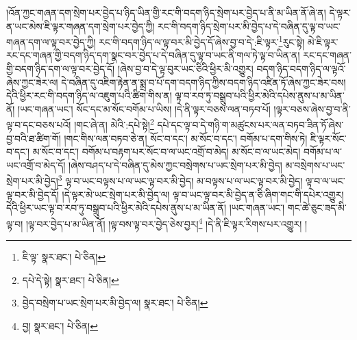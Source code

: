 །འོན་ཀྱང་གཞན་དག་སྲེག་པར་བྱེད་པ་ཉིད་ཡིན་གྱི་རང་གི་བདག་ཉིད་སྲེག་པར་བྱེད་པ་ནི་མ་ཡིན་ནོ་ཞེ་ན། དེ་ལྟར་ན་ཡང་མེས་ཇི་ལྟར་གཞན་དག་སྲེག་པར་བྱེད་ཀྱི། རང་གི་བདག་ཉིད་སྲེག་པར་མི་བྱེད་པ་དེ་བཞིན་དུ་ལྟ་བ་ཡང་གཞན་དག་ལ་ལྟ་བར་བྱེད་ཀྱི། རང་གི་བདག་ཉིད་ལ་ལྟ་བར་མི་བྱེད་དོ་ཞེས་བྱ་བ་དེ་:ཇི་ལྟར་\footnote{ཇི་ལྟ་  སྣར་ཐང་།  པེ་ཅིན། }རུང་སྟེ། མེ་ཇི་ལྟར་རང་དང་གཞན་གྱི་བདག་ཉིད་དག་སྣང་བར་བྱེད་པ་དེ་བཞིན་དུ་ལྟ་བ་ཡང་ནི་གལ་ཏེ་ལྟ་བ་ཡིན་ན། རང་དང་གཞན་གྱི་བདག་ཉིད་དག་ལ་ལྟ་བར་བྱེད་དོ། །ཞེས་བྱ་བ་དེ་ལྟ་བུར་ཡང་ཅིའི་ཕྱིར་མི་འགྱུར། བདག་ཉིད་བདག་ཉིད་ལ་ལྟའོ་ཞེས་ཀྱང་ཟེར་ལ། དེ་བཞིན་དུ་འཇིག་རྟེན་ན་སྨྲ་བ་པོ་དག་བདག་ཉིད་ཀྱིས་བདག་ཉིད་འཛིན་ཏོ་ཞེས་ཀྱང་ཟེར་བས། དེའི་ཕྱིར་རང་གི་བདག་ཉིད་ལ་འཇུག་པའི་ཚིག་གིས་ན། ལྟ་བ་རབ་ཏུ་བསྒྲུབ་པའི་ཕྱིར་མེའི་དཔེས་ནུས་པ་མ་ཡིན་ནོ། །ཡང་གཞན་ཡང་། སོང་དང་མ་སོང་བགོམ་པ་ཡིས། །དེ་ནི་ལྟར་བཅས་ལན་བཏབ་པོ། །ལྟར་བཅས་ཞེས་བྱ་བ་ནི་ལྟ་བ་དང་བཅས་པའོ། །གང་ཞེ་ན། མེའི་:དཔེ་སྟེ།\footnote{དཔེ་དེ་སྟེ།  སྣར་ཐང་།  པེ་ཅིན། } དཔེ་དང་ལྟ་བ་དེ་གཉི་ག་མཚུངས་པར་ལན་བཏབ་ཟིན་ཏོ་ཞེས་བྱ་བའི་ཐ་ཚིག་གོ། །གང་གིས་ལན་བཏབ་ཅེ་ན། སོང་བ་དང་། མ་སོང་བ་དང་། བགོམ་པ་དག་གིས་ཏེ། ཇི་ལྟར་སོང་བ་དང་། མ་སོང་བ་དང་། བགོམ་པ་བརྟག་པར་སོང་བ་ལ་ཡང་འགྲོ་བ་མེད། མ་སོང་བ་ལ་ཡང་མེད། བགོམ་པ་ལ་ཡང་འགྲོ་བ་མེད་དོ། །ཞེས་བཤད་པ་དེ་བཞིན་དུ་མེས་ཀྱང་བསྲེགས་པ་ཡང་སྲེག་པར་མི་བྱེད། མ་བསྲེགས་པ་ཡང་སྲེག་པར་མི་བྱེད།\footnote{བྱེད་བསྲེག་པ་ཡང་སྲེག་པར་མི་བྱེད་ལ།  སྣར་ཐང་།  པེ་ཅིན། } ལྟ་བ་ཡང་བལྟས་པ་ལ་ཡང་ལྟ་བར་མི་བྱེད། མ་བལྟས་པ་ལ་ཡང་ལྟ་བར་མི་བྱེད། ལྟ་བ་ལ་ཡང་ལྟ་བར་མི་བྱེད་དོ། །དེ་ལྟར་མེ་ཡང་སྲེག་པར་མི་བྱེད་ལ། ལྟ་བ་ཡང་ལྟ་བར་མི་བྱེད་ན་ཅི་ཞིག་གང་གི་དཔེར་འགྱུར། དེའི་ཕྱིར་ཡང་ལྟ་བ་རབ་ཏུ་བསྒྲུབ་པའི་ཕྱིར་མེའི་དཔེས་ནུས་པ་མ་ཡིན་ནོ། །ཡང་གཞན་ཡང་། གང་ཚེ་ཅུང་ཟད་མི་ལྟ་བ། །ལྟ་བར་བྱེད་པ་མ་ཡིན་ནོ། །ལྟ་བས་ལྟ་བར་བྱེད་ཅེས་བྱར།\footnote{བྱ།  སྣར་ཐང་།  པེ་ཅིན། } །དེ་ནི་ཇི་ལྟར་རིགས་པར་འགྱུར། །
